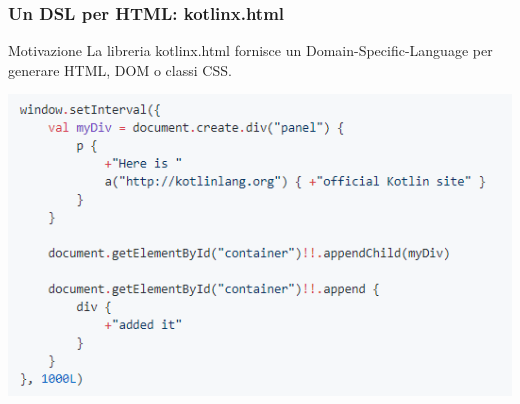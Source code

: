     \begin{frame}
      \frametitle{Un DSL per HTML: \textbf{kotlinx.html}}
      \begin{block}{Motivazione}
        La libreria kotlinx.html fornisce un Domain-Specific-Language per \alert{generare} HTML, DOM o classi CSS.
      \end{block}
      \begin{center}
        \includegraphics[scale=0.67]{KotlinxHtmlEx}
      \end{center}
    \end{frame}

